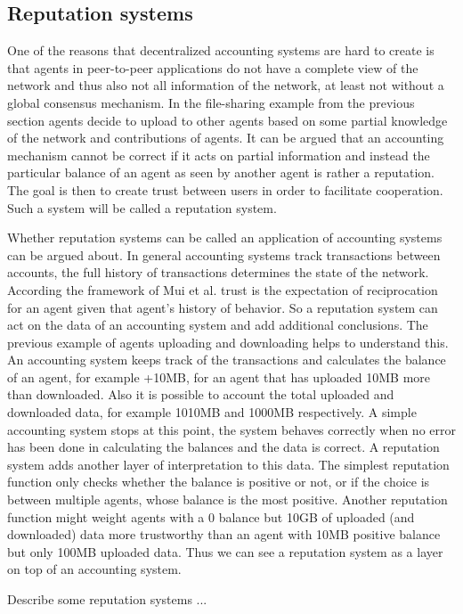 \subsection{Reputation systems}
One of the reasons that decentralized accounting systems are hard to create is that agents in
peer-to-peer applications do not have a complete view of the network and thus also not all 
information of the network, at least not without a global consensus mechanism. In the file-sharing
example from the previous section agents decide to upload to other agents based on some partial 
knowledge of the network and contributions of agents. It can be argued that an accounting mechanism
cannot be correct if it acts on partial information and instead the particular balance of an agent 
as seen by another agent is rather a reputation. The goal is then to create trust between users in 
order to facilitate cooperation. Such a system will be called a reputation system. 

Whether reputation systems can be called an application of accounting systems can be argued about. 
In general accounting systems track transactions between accounts, the full history of transactions
determines the state of the network. According the framework of Mui et al. trust is the expectation
of reciprocation for an agent given that agent's history of behavior. So a reputation system can act 
on the data of an accounting system and add additional conclusions. The previous example of agents
uploading and downloading helps to understand this. An accounting system keeps track of the 
transactions and calculates the balance of an agent, for example +10MB, for an agent that has 
uploaded 10MB more than downloaded. Also it is possible to account the total uploaded and downloaded
data, for example 1010MB and 1000MB respectively. A simple accounting system stops at this point, 
the system behaves correctly when no error has been done in calculating the balances and the data is
correct. A reputation system adds another layer of interpretation to this data. The simplest 
reputation function only checks whether the balance is positive or not, or if the choice is between
multiple agents, whose balance is the most positive. Another reputation function might weight agents
with a 0 balance but 10GB of uploaded (and downloaded) data more trustworthy than an agent with 10MB
positive balance but only 100MB uploaded data. Thus we can see a reputation system as a layer on top
of an accounting system.

Describe some reputation systems ...

